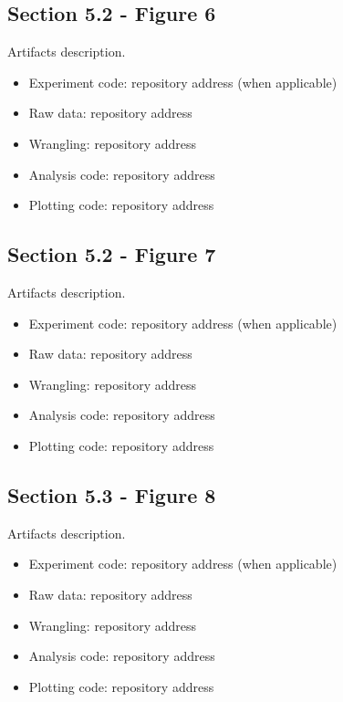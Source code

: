 \subsection{Section 5.2 - Figure 6}
\label{apndx:fig6}

Artifacts description.

\begin{itemize}
    \item Experiment code: repository address (when applicable)
    \item Raw data: repository address
    \item Wrangling: repository address
    \item Analysis code: repository address
    \item Plotting code: repository address
\end{itemize}

\subsection{Section 5.2 - Figure 7}
\label{apndx:fig7}

Artifacts description.

\begin{itemize}
    \item Experiment code: repository address (when applicable)
    \item Raw data: repository address
    \item Wrangling: repository address
    \item Analysis code: repository address
    \item Plotting code: repository address
\end{itemize}

\subsection{Section 5.3 - Figure 8}
\label{apndx:fig8}

Artifacts description.

\begin{itemize}
    \item Experiment code: repository address (when applicable)
    \item Raw data: repository address
    \item Wrangling: repository address
    \item Analysis code: repository address
    \item Plotting code: repository address
\end{itemize}

